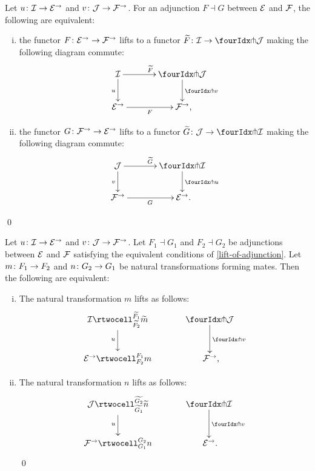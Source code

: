 \documentclass[reqno,10pt,a4paper,oneside,draft]{amsart}
\begin{document}
{{\begin{proposition} \label{lift-of-adjunction}
Let $u \co \cal{I} \to \catE^\to$ and $v \co \cal{J} \to \cal{F}^\to$.
For an adjunction $F \dashv G$ between $\cal{E}$ and $\cal{F}$, the following are equivalent:
\begin{enumerate}[(i)]
\item the functor $F \co \catE^\to \to \cal{F}^\to$ lifts to a functor $\widetilde{F} \co \cal{I} \to \liftl{\cal{J}}$ making the following diagram commute:
\[
\xymatrix@C=1.2cm{
  \cal{I}
  \ar[r]^{\widetilde{F}}
  \ar[d]_{u}
&
  \liftl{\cal{J}}
  \ar[d]^{\liftl{v}}
\\
  \catE^\to
  \ar[r]_-{F}
&
  \cal{F}^\to
\rlap{,}}
\]
\item the functor $G \co \cal{F}^\to \to \catE^\to$ lifts to a functor $\widetilde{G} \co \cal{J} \to \liftr{\cal{I}}$ making the following diagram commute:
\[
\xymatrix@C=1.2cm{
  \cal{J}
  \ar[d]_{v}
  \ar[r]^{\widetilde{G}}
&
  \liftr{\cal{I}}
  \ar[d]^{\liftr{u}}
\\
  \cal{F}^\to
  \ar[r]_{G}
&
  \catE^\to
\rlap{.}  }
\]
\end{enumerate}
\qed
\end{proposition}

\begin{proposition} \label{lift-of-mates}
Let $u \co \cal{I} \to \catE^\to$ and $v \co \cal{J} \to \cal{F}^\to$.
Let $F_1 \dashv G_1$ and $F_2 \dashv G_2$ be adjunctions between $\cal{E}$ and $\cal{F}$ satisfying the equivalent conditions of \cref{lift-of-adjunction}.
Let $m \co F_1 \to F_2$ and $n \co G_2 \to G_1$ be natural transformations forming mates.
Then the following are equivalent:
\begin{enumerate}[(i)]
\item
The natural transformation $m$ lifts as follows:
\[
\xymatrix@C=1.2cm{
  \cal{I}
  \rtwocell_{\widetilde{F_2}}^{\widetilde{F_1}}{\widetilde{m}}
  \ar[d]_{u}
&
  \liftl{\cal{J}}
  \ar[d]^{\liftl{v}}
\\
  \catE^\to
  \rtwocell_{F_2}^{F_1}{m}
&
  \cal{F}^\to
\rlap{,}}
\]
\item
The natural transformation $n$ lifts as follows:
\[
\xymatrix@C=1.2cm{
  \cal{J}
  \rtwocell_{\widetilde{G_1}}^{\widetilde{G_2}}{\widetilde{n}}
  \ar[d]_{u}
&
  \liftr{\cal{I}}
  \ar[d]^{\liftl{v}}
\\
  \cal{F}^\to
  \rtwocell_{G_1}^{G_2}{n}
&
  \cal{E}^\to
\rlap{.}}
\]
\qed
\end{enumerate}
\end{proposition}

}}
\end{document}
